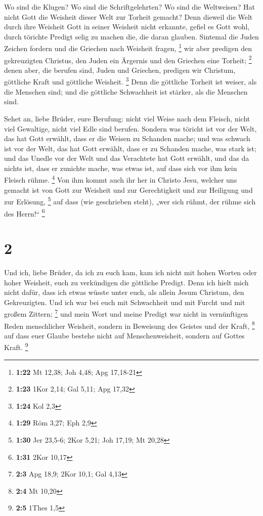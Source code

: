  Wo sind die Klugen? Wo sind die Schriftgelehrten? Wo
sind die Weltweisen? Hat nicht Gott die Weisheit dieser Welt zur Torheit
gemacht?  Denn dieweil die Welt durch ihre Weisheit Gott
in seiner Weisheit nicht erkannte, gefiel es Gott wohl, durch törichte
Predigt selig zu machen die, die daran glauben.  Sintemal
die Juden Zeichen fordern und die Griechen nach Weisheit fragen,
\footnote{\textbf{1:22} Mt 12,38; Joh 4,48; Apg 17,18-21}
 wir aber predigen den gekreuzigten Christus, den Juden
ein Ärgernis und den Griechen eine Torheit; \footnote{\textbf{1:23} 1Kor
  2,14; Gal 5,11; Apg 17,32}  denen aber, die berufen
sind, Juden und Griechen, predigen wir Christum, göttliche Kraft und
göttliche Weisheit. \footnote{\textbf{1:24} Kol 2,3} 
Denn die göttliche Torheit ist weiser, als die Menschen sind; und die
göttliche Schwachheit ist stärker, als die Menschen sind.

 Sehet an, liebe Brüder, eure Berufung: nicht viel Weise
nach dem Fleisch, nicht viel Gewaltige, nicht viel Edle sind berufen.
 Sondern was töricht ist vor der Welt, das hat Gott
erwählt, dass er die Weisen zu Schanden mache; und was schwach ist vor
der Welt, das hat Gott erwählt, dass er zu Schanden mache, was stark
ist;  und das Unedle vor der Welt und das Verachtete hat
Gott erwählt, und das da nichts ist, dass er zunichte mache, was etwas
ist,  auf dass sich vor ihm kein Fleisch rühme.
\footnote{\textbf{1:29} Röm 3,27; Eph 2,9}  Von ihm kommt
auch ihr her in Christo Jesu, welcher uns gemacht ist von Gott zur
Weisheit und zur Gerechtigkeit und zur Heiligung und zur Erlösung,
\footnote{\textbf{1:30} Jer 23,5-6; 2Kor 5,21; Joh 17,19; Mt 20,28}
 auf dass (wie geschrieben steht), „wer sich rühmt, der
rühme sich des Herrn!{}`` \footnote{\textbf{1:31} 2Kor 10,17}

\hypertarget{section-1}{%
\section{2}\label{section-1}}

 Und ich, liebe Brüder, da ich zu euch kam, kam ich nicht
mit hohen Worten oder hoher Weisheit, euch zu verkündigen die göttliche
Predigt.  Denn ich hielt mich nicht dafür, dass ich etwas
wüsste unter euch, als allein Jesum Christum, den Gekreuzigten.
 Und ich war bei euch mit Schwachheit und mit Furcht und
mit großem Zittern; \footnote{\textbf{2:3} Apg 18,9; 2Kor 10,1; Gal 4,13}
 und mein Wort und meine Predigt war nicht in vernünftigen
Reden menschlicher Weisheit, sondern in Beweisung des Geistes und der
Kraft, \footnote{\textbf{2:4} Mt 10,20}  auf dass euer
Glaube bestehe nicht auf Menschenweisheit, sondern auf Gottes Kraft.
\footnote{\textbf{2:5} 1Thes 1,5}

